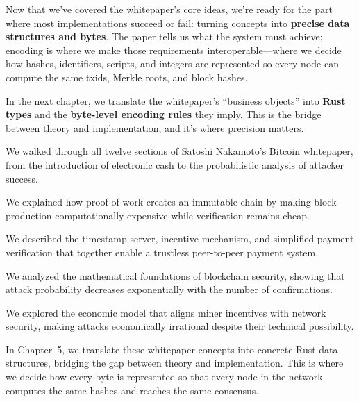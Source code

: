 Now that we've covered the whitepaper's core ideas, we're ready for the part where most implementations succeed or fail: turning concepts into \textbf{precise data structures and bytes}. The paper tells us what the system must achieve; encoding is where we make those requirements interoperable---where we decide how hashes, identifiers, scripts, and integers are represented so every node can compute the same txids, Merkle roots, and block hashes.

In the next chapter, we translate the whitepaper's ``business objects'' into \textbf{Rust types} and the \textbf{byte-level encoding rules} they imply. This is the bridge between theory and implementation, and it's where precision matters.

\begin{chaptersummary}
  \item We walked through all twelve sections of Satoshi Nakamoto's Bitcoin whitepaper, from the introduction of electronic cash to the probabilistic analysis of attacker success.

  \item We explained how proof-of-work creates an immutable chain by making block production computationally expensive while verification remains cheap.

  \item We described the timestamp server, incentive mechanism, and simplified payment verification that together enable a trustless peer-to-peer payment system.

  \item We analyzed the mathematical foundations of blockchain security, showing that attack probability decreases exponentially with the number of confirmations.

  \item We explored the economic model that aligns miner incentives with network security, making attacks economically irrational despite their technical possibility.

  \item In Chapter~5, we translate these whitepaper concepts into concrete Rust data structures, bridging the gap between theory and implementation. This is where we decide how every byte is represented so that every node in the network computes the same hashes and reaches the same consensus.
\end{chaptersummary}
